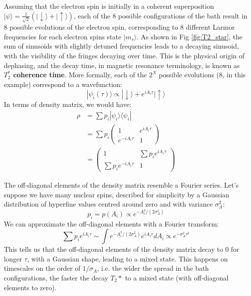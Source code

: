 \documentclass[a4paper,11pt]{article}
\newcommand{\ket}[1]{| #1 \rangle}
\newcommand{\bra}[1]{\langle #1 |}
\begin{document}
Assuming that the electron spin is initially in a coherent superposition $\ket{\psi} = \frac{1}{\sqrt{2}} \left( \ket{\downarrow} + \ket{\uparrow} \right)$, each of the $8$ possible configurations of the bath result in $8$ possible evolutions of the electron spin, corresponding to 8 different Larmor frequencies for each electron spins state $\ket{m_s}$. As shown in Fig \ref{fig:T2_star}, the sum of sinusoids with slightly detuned frequencies leads to a decaying sinusoid, with the visibility of the fringes decaying over time. This is the physical origin of dephasing, and the decay time, in magnetic resonance terminology, is known as {\bf $T_2^*$ coherence time}. More formally, each of the $2^N$ possible evolutions ($8$, in this example) correspond to a wavefunction:
\begin{equation}
    \ket{\psi_i (\tau)} \propto \ket{\downarrow} + e^{i A_i \tau} \ket{\uparrow}
\end{equation}
In terms of density matrix, we would have:
\begin{equation}
\begin{split}
    \rho &= \sum p_i \ket{\psi_i} \bra{\psi_i}\\
    &= \sum p_i \left(\begin{array}{cc}
1 & e^{i A_i \tau} \\
e^{-i A_i \tau} & 1\end{array} \right)\\
    &= \left(\begin{array}{cc}
1 & \sum p_i e^{i A_i \tau} \\
\sum p_i e^{-i A_i \tau} & 1\end{array} \right)
\end{split}
\end{equation}

The off-diagonal elements of the density matrix resemble a Fourier series. Let's suppose we have many nuclear spins, described for simplicity by a Gaussian distribution of hyperfine values centred around zero and with variance $\sigma_A^2$:
\begin{equation}
    p_i = p(A_i) \propto e^{-A_i^2/(2 \sigma_A^2)}
\end{equation}
We can approximate the off-diagonal elements with a Fourier transform:
\begin{equation}
    \sum p_i e^{i A_i \tau} \sim \int e^{-A_i^2/(2 \sigma_A^2)} e^{i A_i \tau} dA_i \propto e^{-\sigma_A^2 \tau^2}
\end{equation}
This tells us that the off-diagonal elements of the density matrix decay to $0$ for longer $\tau$, with a Gaussian shape, leading to a mixed state. This happens on timescales on the order of $1/\sigma_A$, i.e. the wider the spread in the bath configurations, the faster the decay $T_2*$ to a mixed state (with off-diagonal elements to zero).
\end{document}
